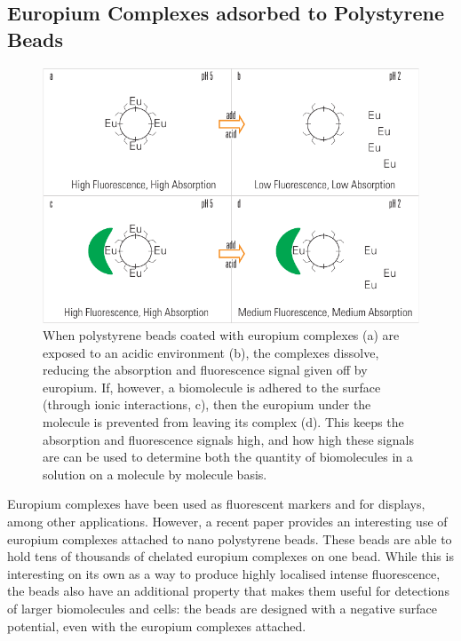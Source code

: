 \subsection{Europium Complexes adsorbed to Polystyrene Beads}\label{subsec:eu_beads}

\begin{figure}[t]
\begin{center}
\includegraphics[]{figures/eu_beads/eu_beads.pdf}
\end{center}
\caption[Europium Bead Protein Assay]{When polystyrene beads coated with europium complexes (a) are exposed to an acidic environment (b), the complexes dissolve, reducing the absorption and fluorescence signal given off by europium. If, however, a biomolecule is adhered to the surface (through ionic interactions, c), then the europium under the molecule is prevented from leaving its complex (d). This keeps the absorption and fluorescence signals high, and how high these signals are can be used to determine both the quantity of biomolecules in a solution on a molecule by molecule basis.}
\label{fig:eu_beads}
\end{figure}

Europium complexes have been used as fluorescent markers and for displays,
among other applications. However, a recent paper provides an interesting use
of europium complexes attached to nano polystyrene beads. These beads are able
to hold tens of thousands of chelated europium complexes on one bead. While
this is interesting on its own as a way to produce highly localised intense
fluorescence, the beads also have an additional property that makes them useful
for detections of larger biomolecules and cells: the beads are designed with a
negative surface potential, even with the europium complexes attached.

